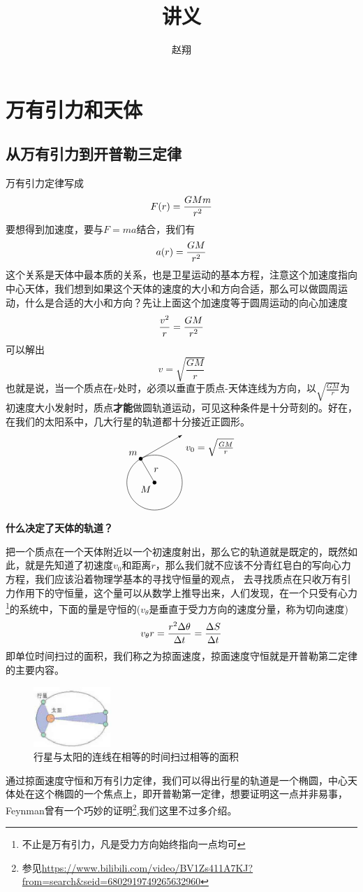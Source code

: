 \documentclass[hyperref,UTF8]{ctexart}
\title{讲义}
\author{赵翔}
\begin{document}
\maketitle
\section{万有引力和天体}
\subsection{从万有引力到开普勒三定律}
万有引力定律写成
\[F(r) = {GMm \over r^2}\]
要想得到加速度，要与$F=ma$结合，我们有
\[a(r) = {GM \over r^2}\]
这个关系是天体中最本质的关系，也是卫星运动的基本方程，注意这个加速度指向中心天体，我们想到如果这个天体的速度的大小和方向合适，那么可以做圆周运动，什么是合适的大小和方向？先让上面这个加速度等于圆周运动的向心加速度
\[{v^2 \over r} = {GM \over r^2}\]
可以解出
\[v = \sqrt{\frac{GM}{r}}\]
也就是说，当一个质点在$r$处时，必须以垂直于质点-天体连线为方向，以$\sqrt{\frac{GM}{r}}$为初速度大小发射时，质点\textbf{才能}做圆轨道运动，可见这种条件是十分苛刻的。好在，在我们的太阳系中，几大行星的轨道都十分接近正圆形。\\
\[
\begin{tikzpicture}
    \draw (0,0) circle (1cm);
    \fill (120:1) circle (2pt);
    \fill (0,0) circle (2pt);
    \node[below left] (O) at (0,0) {$M$};
    \node[above left] (A) at (120:1) {$m$};
    \node[below right] (A) at (60:2) {$v_0 = \sqrt{\frac{GM}{r}}$};
    \draw[-latex] (120:1)--(60:2);
    \draw (0,0)--(120:1);
    \node[above right] (O) at (120:0.3) {$r$};
\end{tikzpicture}
\]
\textbf{什么决定了天体的轨道？}

把一个质点在一个天体附近以一个初速度射出，那么它的轨道就是既定的，既然如此，就是先知道了初速度$v_0$和距离$r$，那么我们就不应该不分青红皂白的写向心力方程，我们应该沿着物理学基本的寻找守恒量的观点，
去寻找质点在只收万有引力作用下的守恒量，这个量可以从数学上推导出来，人们发现，在一个只受有心力\footnote{不止是万有引力，凡是受力方向始终指向一点均可}的系统中，下面的量是守恒的($v_\theta$是垂直于受力方向的速度分量，称为切向速度)
\[v_{\theta}r = {r^2\Delta \theta \over \Delta t} = {\Delta S \over \Delta t}\]
即单位时间扫过的面积，我们称之为掠面速度，掠面速度守恒就是开普勒第二定律的主要内容。
\begin{figure}[H]
    \centering
    \includegraphics[width=3cm]{掠面速度.png}
    \caption{行星与太阳的连线在相等的时间扫过相等的面积}
\end{figure}
通过掠面速度守恒和万有引力定律，我们可以得出行星的轨道是一个椭圆，中心天体处在这个椭圆的一个焦点上，即开普勒第一定律，想要证明这一点并非易事，Feynman曾有一个巧妙的证明\footnote{参见\url{https://www.bilibili.com/video/BV1Zs411A7KJ?from=search&seid=6802919749265632960}},我们这里不过多介绍。
\end{document}
